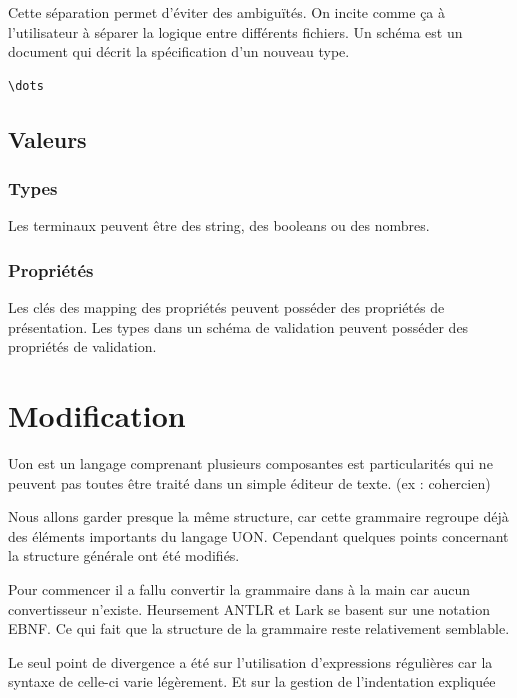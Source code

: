 \documentclass[
    iict, %
    il, %
]{heig-tb}
\begin{document}
Cette séparation permet d'éviter des ambiguïtés. On incite comme ça à l'utilisateur à séparer la logique entre différents fichiers.
Un schéma est un document qui décrit la spécification d'un nouveau type.

\begin{lstlisting}[frame=single,caption={yaml-seq},label={yaml-seq}]
    \dots
\end{lstlisting}

\subsection{Valeurs}

\subsubsection{Types}
Les terminaux peuvent être des string, des booleans ou des nombres.

\subsubsection{Propriétés}
Les clés des mapping des propriétés peuvent posséder des propriétés de présentation.
Les types dans un schéma de validation peuvent posséder des propriétés de validation.

\section{Modification}


Uon est un langage comprenant plusieurs composantes est particularités qui ne peuvent pas toutes être traité dans un simple éditeur de texte. (ex : cohercien)
%

Nous allons garder presque la même structure, car cette grammaire regroupe déjà des éléments importants du langage UON.
Cependant quelques points concernant la structure générale ont été modifiés.

Pour commencer il a fallu convertir la grammaire dans à la main car aucun convertisseur n’existe. Heursement ANTLR et Lark se basent sur une notation EBNF.
Ce qui fait que la structure de la grammaire reste relativement semblable.

Le seul point de divergence a été sur l'utilisation d'expressions régulières car la syntaxe de celle-ci varie légèrement. Et sur la gestion de l'indentation expliquée %
\end{document}
